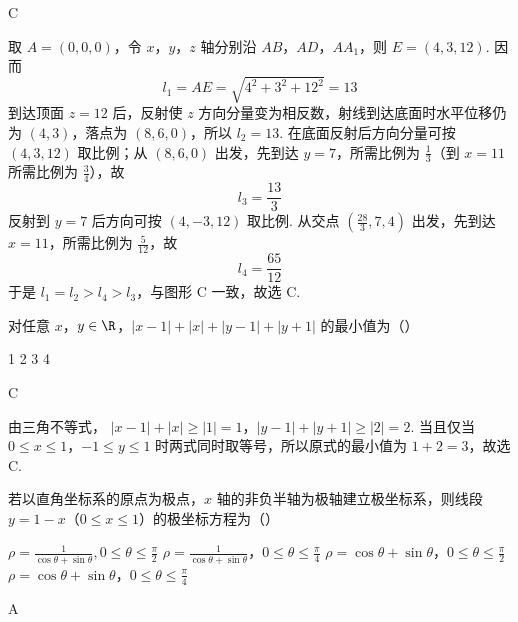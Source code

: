 \begin{answer}
C
\end{answer}

\begin{solution}
取 \(A=(0,0,0)\)，令 \(x\)，\(y\)，\(z\) 轴分别沿 \(AB\)，\(AD\)，\(AA_1\)，则 \(E=(4,3,12)\). 因而
\[
l_1=AE=\sqrt{4^2+3^2+12^2}=13
\]
到达顶面 \(z=12\) 后，反射使 \(z\) 方向分量变为相反数，射线到达底面时水平位移仍为 \((4,3)\)，落点为 \((8,6,0)\)，所以 \(l_2=13\). 在底面反射后方向分量可按 \((4,3,12)\) 取比例；从 \((8,6,0)\) 出发，先到达 \(y=7\)，所需比例为 \(\frac13\)（到 \(x=11\) 所需比例为 \(\frac34\)），故
\[
l_3=\frac{13}{3}
\]
反射到 \(y=7\) 后方向可按 \((4,-3,12)\) 取比例. 从交点 \((\frac{28}{3},7,4)\) 出发，先到达 \(x=11\)，所需比例为 \(\frac{5}{12}\)，故
\[
l_4=\frac{65}{12}
\]
于是 \(l_1=l_2>l_4>l_3\)，与图形 C 一致，故选 C.
\end{solution}

\begin{problem}
对任意 \(x\)，\(y \in \R\)，\(|x - 1| + |x| + |y - 1| + |y + 1|\) 的最小值为（\quad）

\choices
    {1}
    {2}
    {3}
    {4}
\end{problem}

\begin{answer}
C
\end{answer}

\begin{solution}
由三角不等式，
\(|x-1|+|x|\geqslant|1|=1\)，\(|y-1|+|y+1|\geqslant|2|=2\).
当且仅当 \(0\leqslant x\leqslant1\)，\(-1\leqslant y\leqslant1\) 时两式同时取等号，所以原式的最小值为 \(1+2=3\)，故选 C.
\end{solution}

\begin{problem}
若以直角坐标系的原点为极点，\(x\) 轴的非负半轴为极轴建立极坐标系，则线段 \(y = 1 - x\)（\(0 \leqslant x \leqslant 1\)）的极坐标方程为（\quad）

\choices
    {\(\rho = \frac{1}{\cos \theta + \sin \theta}, 0 \leqslant \theta \leqslant \frac{\pi}{2}\)}
    {\(\rho = \frac{1}{\cos \theta + \sin \theta}\)，\(0 \leqslant \theta \leqslant \frac{\pi}{4}\)}
    {\(\rho = \cos \theta + \sin \theta\)，\(0 \leqslant \theta \leqslant \frac{\pi}{2}\)}
    {\(\rho = \cos \theta + \sin \theta\)，\(0 \leqslant \theta \leqslant \frac{\pi}{4}\)}
\end{problem}

\begin{answer}
A
\end{answer}

